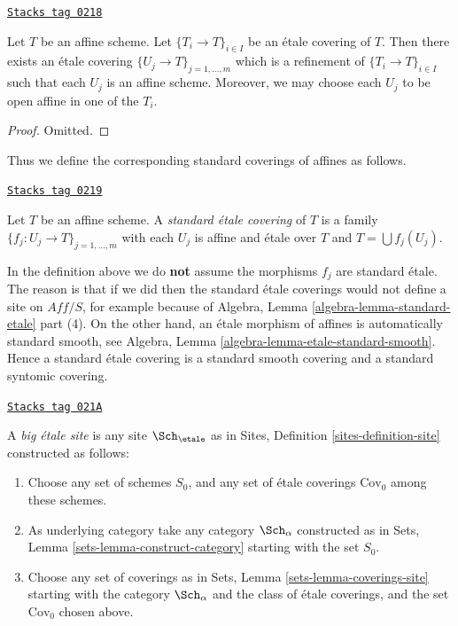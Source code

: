 \begin{lemma}
\label{topologies-lemma-etale-affine}
\href{https://stacks.math.columbia.edu/tag/0218}{\texttt{Stacks tag 0218}}

Let $T$ be an affine scheme.
Let $\{T_i \to T\}_{i \in I}$ be an \'etale covering of $T$.
Then there exists an \'etale covering
$\{U_j \to T\}_{j = 1, \ldots, m}$ which is a refinement
of $\{T_i \to T\}_{i \in I}$ such that each $U_j$ is an affine
scheme. Moreover, we may choose each $U_j$ to be open affine
in one of the $T_i$.
\end{lemma}

\begin{proof}
Omitted.
\end{proof}

Thus we define the corresponding standard coverings of affines as follows.

\begin{definition}
\label{topologies-definition-standard-etale}
\href{https://stacks.math.columbia.edu/tag/0219}{\texttt{Stacks tag 0219}}

Let $T$ be an affine scheme. A {\it standard \'etale covering}
of $T$ is a family $\{f_j : U_j \to T\}_{j = 1, \ldots, m}$
with each $U_j$ is affine and \'etale over $T$ and
$T = \bigcup f_j(U_j)$.
\end{definition}

In the definition above we do {\bf not} assume the morphisms $f_j$ are
standard \'etale. The reason is that if we did then the standard \'etale
coverings would not define a site on $\textit{Aff}/S$, for example because of
Algebra, Lemma \ref{algebra-lemma-standard-etale} part (4).
On the other hand, an \'etale morphism of affines is automatically
standard smooth, see
Algebra, Lemma \ref{algebra-lemma-etale-standard-smooth}.
Hence a standard \'etale covering is a standard smooth
covering and a standard syntomic covering.

\begin{definition}
\label{topologies-definition-big-etale-site}
\href{https://stacks.math.columbia.edu/tag/021A}{\texttt{Stacks tag 021A}}

A {\it big \'etale site} is any site $\Sch_\etale$ as in
Sites, Definition \ref{sites-definition-site} constructed as follows:
\begin{enumerate}
\item Choose any set of schemes $S_0$, and any set of \'etale coverings
$\text{Cov}_0$ among these schemes.
\item As underlying category take any category $\Sch_\alpha$
constructed as in Sets, Lemma \ref{sets-lemma-construct-category}
starting with the set $S_0$.
\item Choose any set of coverings as in
Sets, Lemma \ref{sets-lemma-coverings-site} starting with the
category $\Sch_\alpha$ and the class of \'etale coverings,
and the set $\text{Cov}_0$ chosen above.
\end{enumerate}
\end{definition}

